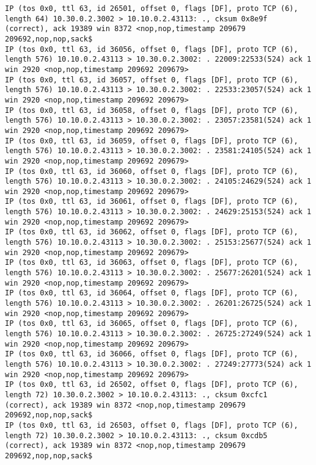 \documentclass[a4paper,12pt]{article}
\begin{document}
\begin{lstlisting}
IP (tos 0x0, ttl 63, id 26501, offset 0, flags [DF], proto TCP (6), length 64) 10.30.0.2.3002 > 10.10.0.2.43113: ., cksum 0x8e9f (correct), ack 19389 win 8372 <nop,nop,timestamp 209679 209692,nop,nop,sack$
IP (tos 0x0, ttl 63, id 36056, offset 0, flags [DF], proto TCP (6), length 576) 10.10.0.2.43113 > 10.30.0.2.3002: . 22009:22533(524) ack 1 win 2920 <nop,nop,timestamp 209692 209679>
IP (tos 0x0, ttl 63, id 36057, offset 0, flags [DF], proto TCP (6), length 576) 10.10.0.2.43113 > 10.30.0.2.3002: . 22533:23057(524) ack 1 win 2920 <nop,nop,timestamp 209692 209679>
IP (tos 0x0, ttl 63, id 36058, offset 0, flags [DF], proto TCP (6), length 576) 10.10.0.2.43113 > 10.30.0.2.3002: . 23057:23581(524) ack 1 win 2920 <nop,nop,timestamp 209692 209679>
IP (tos 0x0, ttl 63, id 36059, offset 0, flags [DF], proto TCP (6), length 576) 10.10.0.2.43113 > 10.30.0.2.3002: . 23581:24105(524) ack 1 win 2920 <nop,nop,timestamp 209692 209679>
IP (tos 0x0, ttl 63, id 36060, offset 0, flags [DF], proto TCP (6), length 576) 10.10.0.2.43113 > 10.30.0.2.3002: . 24105:24629(524) ack 1 win 2920 <nop,nop,timestamp 209692 209679>
IP (tos 0x0, ttl 63, id 36061, offset 0, flags [DF], proto TCP (6), length 576) 10.10.0.2.43113 > 10.30.0.2.3002: . 24629:25153(524) ack 1 win 2920 <nop,nop,timestamp 209692 209679>
IP (tos 0x0, ttl 63, id 36062, offset 0, flags [DF], proto TCP (6), length 576) 10.10.0.2.43113 > 10.30.0.2.3002: . 25153:25677(524) ack 1 win 2920 <nop,nop,timestamp 209692 209679>
IP (tos 0x0, ttl 63, id 36063, offset 0, flags [DF], proto TCP (6), length 576) 10.10.0.2.43113 > 10.30.0.2.3002: . 25677:26201(524) ack 1 win 2920 <nop,nop,timestamp 209692 209679>
IP (tos 0x0, ttl 63, id 36064, offset 0, flags [DF], proto TCP (6), length 576) 10.10.0.2.43113 > 10.30.0.2.3002: . 26201:26725(524) ack 1 win 2920 <nop,nop,timestamp 209692 209679>
IP (tos 0x0, ttl 63, id 36065, offset 0, flags [DF], proto TCP (6), length 576) 10.10.0.2.43113 > 10.30.0.2.3002: . 26725:27249(524) ack 1 win 2920 <nop,nop,timestamp 209692 209679>
IP (tos 0x0, ttl 63, id 36066, offset 0, flags [DF], proto TCP (6), length 576) 10.10.0.2.43113 > 10.30.0.2.3002: . 27249:27773(524) ack 1 win 2920 <nop,nop,timestamp 209692 209679>
IP (tos 0x0, ttl 63, id 26502, offset 0, flags [DF], proto TCP (6), length 72) 10.30.0.2.3002 > 10.10.0.2.43113: ., cksum 0xcfc1 (correct), ack 19389 win 8372 <nop,nop,timestamp 209679 209692,nop,nop,sack$
IP (tos 0x0, ttl 63, id 26503, offset 0, flags [DF], proto TCP (6), length 72) 10.30.0.2.3002 > 10.10.0.2.43113: ., cksum 0xcdb5 (correct), ack 19389 win 8372 <nop,nop,timestamp 209679 209692,nop,nop,sack$

\end{lstlisting}
\end{document}
